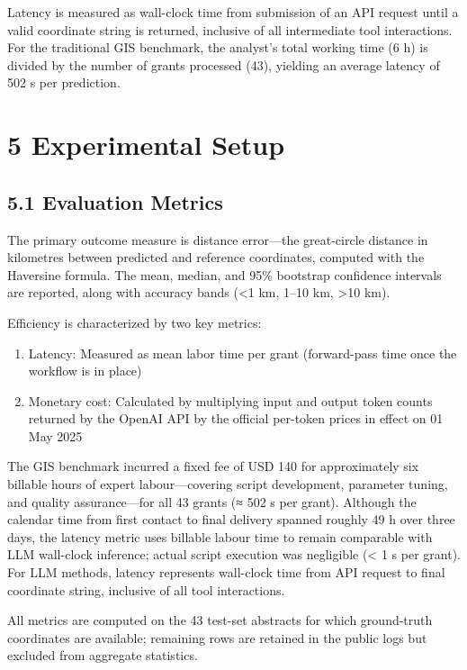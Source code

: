 \documentclass[
  10pt,
  twocolumn]{article}
\providecommand{\tightlist}{%
  \setlength{\itemsep}{0pt}\setlength{\parskip}{0pt}}
\begin{document}
Latency is measured as wall-clock time from submission of an API request
until a valid coordinate string is returned, inclusive of all
intermediate tool interactions. For the traditional GIS benchmark, the
analyst's total working time (6 h) is divided by the number of grants
processed (43), yielding an average latency of 502 s per prediction.

\section{5 Experimental Setup}\label{experimental-setup}

\subsection{5.1 Evaluation Metrics}\label{evaluation-metrics}

The primary outcome measure is distance error---the great-circle
distance in kilometres between predicted and reference coordinates,
computed with the Haversine formula. The mean, median, and 95\%
bootstrap confidence intervals are reported, along with accuracy bands
(\textless1 km, 1--10 km, \textgreater10 km).

Efficiency is characterized by two key metrics:

\begin{enumerate}
\def\labelenumi{\arabic{enumi}.}
\tightlist
\item
  Latency: Measured as mean labor time per grant (forward-pass time once
  the workflow is in place)
\item
  Monetary cost: Calculated by multiplying input and output token counts
  returned by the OpenAI API by the official per-token prices in effect
  on 01 May 2025
\end{enumerate}

The GIS benchmark incurred a fixed fee of USD 140 for approximately six
billable hours of expert labour---covering script development, parameter
tuning, and quality assurance---for all 43 grants (≈ 502 s per grant).
Although the calendar time from first contact to final delivery spanned
roughly 49 h over three days, the latency metric uses billable labour
time to remain comparable with LLM wall-clock inference; actual script
execution was negligible (\textless{} 1 s per grant). For LLM methods,
latency represents wall-clock time from API request to final coordinate
string, inclusive of all tool interactions.

All metrics are computed on the 43 test-set abstracts for which
ground-truth coordinates are available; remaining rows are retained in
the public logs but excluded from aggregate statistics.
\end{document}

